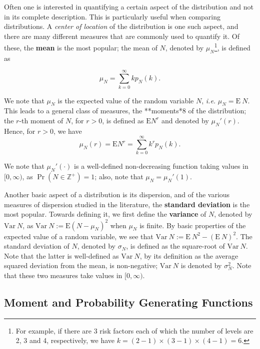 \documentclass[]{book}
\let\rmarkdownfootnote\footnote%
\def\footnote{\protect\rmarkdownfootnote}
\theoremstyle{definition}
\theoremstyle{definition}
\theoremstyle{definition}
\theoremstyle{remark}
\begin{document}
Often one is interested in quantifying a certain aspect of the
distribution and not in its complete description. This is particularly
useful when comparing distributions. A \emph{center of location} of the
distribution is one such aspect, and there are many different measures
that are commonly used to quantify it. Of these, the \textbf{mean} is
the most popular; the mean of \(N\), denoted by \(\mu_N\)\footnote{For
  example, if there are 3 risk factors each of which the number of
  levels are 2, 3 and 4, respectively, we have
  \(k=(2-1)\times(3-1)\times (4-1)=6\).}, is defined as

\begin{equation}
\mu_N=\sum_{k=0}^\infty kp_N(k).
\end{equation}

We note that \(\mu_N\) is the expected value of the random variable
\(N\), \emph{i.e.} \(\mu_N=\mathrm{E}~N\). This leads to a general class
of measures, the **moments*8 of the distribution; the \(r\)-th moment of
\(N\), for \(r> 0\), is defined as \(\mathrm{E}{N^r}\) and denoted by
\(\mu_N'(r)\). Hence, for \(r>0\), we have\\

\begin{equation}
\mu_N(r)= \mathrm{E}{N^r}= \sum_{k=0}^\infty k^r p_N(k).
\end{equation}

We note that \(\mu_N'(\cdot)\) is a well-defined non-decreasing function
taking values in \([0,\infty)\), as \(\Pr(N\in\mathbb{Z}^+)=1\); also,
note that \(\mu_N=\mu_N'(1)\).

Another basic aspect of a distribution is its dispersion, and of the
various measures of dispersion studied in the literature, the
\textbf{standard deviation} is the most popular. Towards defining it, we
first define the \textbf{variance} of \(N\), denoted by
\(\mathrm{Var}~N\), as \(\mathrm{Var}~N:=\mathrm{E}{(N-\mu_N)^2}\) when
\(\mu_N\) is finite. By basic properties of the expected value of a
random variable, we see that
\(\mathrm{Var}~N:=\mathrm{E}~{N^2}-(\mathrm{E}~N)^2\). The standard
deviation of \(N\), denoted by \(\sigma_N\), is defined as the
square-root of \(\mathrm{Var}~N\). Note that the latter is well-defined
as \(\mathrm{Var}~N\), by its definition as the average squared
deviation from the mean, is non-negative; \(\mathrm{Var}~N\) is denoted
by \(\sigma_N^2\). Note that these two measures take values in
\([0,\infty)\).

\subsection{Moment and Probability Generating
Functions}\label{S:generating-functions}
\end{document}
